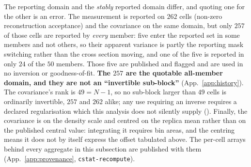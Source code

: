 The reporting domain and the \emph{stably} reported domain differ, and quoting one for the other is an error. The measurement is reported on $262$ cells (non-zero reconstruction acceptance) and the covariance on the same domain, but only $257$ of those cells are reported by \emph{every} member: five enter the reported set in some members and not others, so their apparent variance is partly the reporting mask switching rather than the cross section moving, and one of the five is reported in only $24$ of the $50$ members. Those five are published and flagged and are used in no inversion or goodness-of-fit. \textbf{The $257$ are the quotable all-member domain, and they are not an ``invertible sub-block''} (App.~\ref{app:history}). The covariance's rank is $49=N-1$, so no sub-block larger than $49$ cells is ordinarily invertible, $257$ and $262$ alike; any use requiring an inverse requires a declared regularisation which this analysis does not silently supply (). Finally, the covariance is on the density scale and centred on the replica mean rather than on the published central value: integrating it requires bin areas, and the centring means it does not by itself express the offset tabulated above. The per-cell arrays behind every aggregate in this subsection are published with them (App.~\ref{app:provenance}, \texttt{cstat-recompute}).
